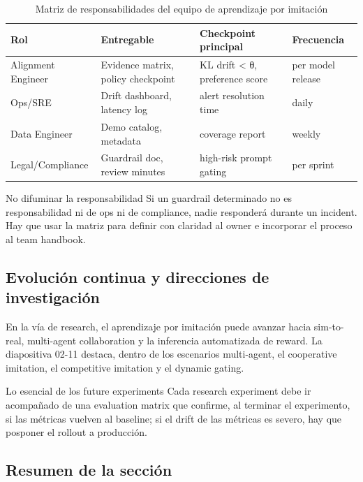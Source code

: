 \documentclass[a4paper]{article}
\begin{document}
\begin{table}[H]
\centering
\begin{tabular}{p{} p{} p{} p{}}
\toprule
Rol & Entregable & Checkpoint principal & Frecuencia \\
\midrule
Alignment Engineer & Evidence matrix, policy checkpoint & KL drift < θ, preference score & per model release \\
Ops/SRE & Drift dashboard, latency log & alert resolution time & daily \\
Data Engineer & Demo catalog, metadata & coverage report & weekly \\
Legal/Compliance & Guardrail doc, review minutes & high-risk prompt gating & per sprint \\
\bottomrule
\end{tabular}
\caption{Matriz de responsabilidades del equipo de aprendizaje por imitación}
\end{table}

\begin{warningbox}{No difuminar la responsabilidad}
Si un guardrail determinado no es responsabilidad ni de ops ni de compliance, nadie responderá durante un incident. Hay que usar la matriz para definir con claridad al owner e incorporar el proceso al team handbook.
\end{warningbox}

\subsection{Evolución continua y direcciones de investigación}

En la vía de research, el aprendizaje por imitación puede avanzar hacia sim-to-real, multi-agent collaboration y la inferencia automatizada de reward. La diapositiva 02-11 destaca, dentro de los escenarios multi-agent, el cooperative imitation, el competitive imitation y el dynamic gating.

\begin{importantbox}{Lo esencial de los future experiments}
Cada research experiment debe ir acompañado de una evaluation matrix que confirme, al terminar el experimento, si las métricas vuelven al baseline; si el drift de las métricas es severo, hay que posponer el rollout a producción.
\end{importantbox}

\subsection{Resumen de la sección}
\end{document}
